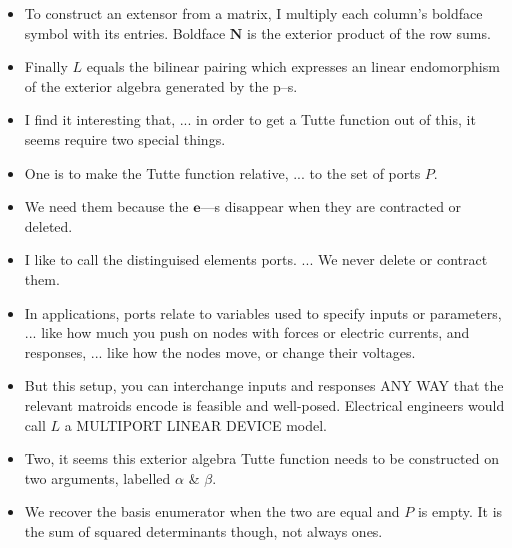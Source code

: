 \documentclass[14pt]{extarticle}
\begin{document}
{\begin{itemize}
\item
To construct an extensor from a matrix, I multiply each column's boldface symbol with its entries.
Boldface $\mathbf{N}$ is the exterior product of the row sums.

\item
  Finally $L$ equals the bilinear pairing which expresses an linear endomorphism
  of the exterior algebra generated by the p--s.

\item
  I find it interesting that, ... in order to get a Tutte function out
  of this, it seems require two special things.

\item
One is to make the Tutte function relative, ... to the set of ports $P$.

\item
  We need them because the $\mathbf{e}$---s  disappear when they are contracted or deleted.

\item
  I like to call the distinguised elements ports. ... We never delete or contract them.


\item In applications, ports relate to variables used to specify inputs
  or parameters, ... like how much you push on nodes with forces or electric currents,
  and responses, ... like how the nodes move, or change their voltages.

\item But this setup, you can interchange inputs and responses ANY WAY that the
  relevant matroids encode is feasible and well-posed.  Electrical engineers would
  call $L$ a MULTIPORT LINEAR DEVICE model.


\item
  Two, it seems this exterior algebra Tutte function needs to be constructed on 
  two arguments, labelled $\alpha$ \& $\beta$.

\item
  We recover the basis enumerator when the two are equal and $P$ is empty.  It
  is the sum of squared determinants though, not always ones.


\end{itemize}}
\end{document}
